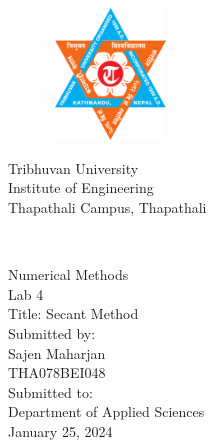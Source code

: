 \documentclass[12pt, a4paper]{article}
\begin{document}
\vline
\begin{bfseries}
	\begin{Large}
	\begin{center}
		\begin{figure}
			\centering
		\includegraphics[height=3.5cm, width=3.3cm]{Tribhuvan_University_Logo.svg.png}
		\end{figure}
		Tribhuvan University\\
		Institute of Engineering\\
		Thapathali Campus, Thapathali\\
		\vspace{2cm}
		\\
		\vspace{2cm}
		\begin{normalsize}
			Numerical Methods\\
			Lab 4\\
			Title: Secant Method\\
			\vspace{1cm}
			Submitted by:\\
			Sajen Maharjan\\
			THA078BEI048\\
			\vspace{1cm}
			Submitted to:\\
			Department of Applied Sciences\\
			\bigskip
			January 25, 2024\\
		\end{normalsize}
	\end{center}
\end{Large}
\end{bfseries}
\end{document}
